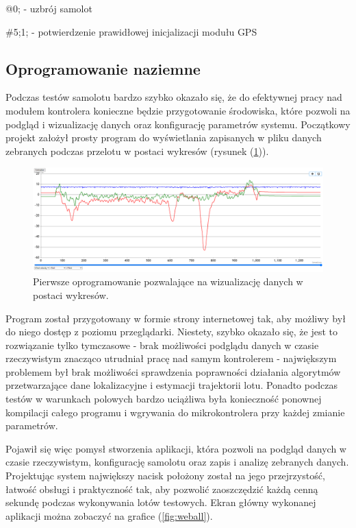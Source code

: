 \documentclass[12pt, a4paper]{article}
\let\oldref\ref
\renewcommand{\ref}[1]{(\oldref{#1})}
\begin{document}
@0; - uzbrój samolot

\#5;1; - potwierdzenie prawidłowej inicjalizacji modułu GPS

\FloatBarrier
\subsection{Oprogramowanie naziemne}
Podczas testów samolotu bardzo szybko okazało się, że do efektywnej pracy nad modułem kontrolera konieczne będzie przygotowanie środowiska, które pozwoli na podgląd i wizualizację danych oraz konfigurację parametrów systemu. Początkowy projekt założył prosty program do wyświetlania zapisanych w pliku danych zebranych podczas przelotu w postaci wykresów (rysunek \ref{fig:staryprogram}).

 \begin{figure}[ht]
    \centering
    \includegraphics[width=1\textwidth]{starysystem}
    \caption{Pierwsze oprogramowanie pozwalające na wizualizację danych w postaci wykresów.}
    \label{fig:staryprogram}
\end{figure}

Program został przygotowany w formie strony internetowej tak, aby możliwy był do niego dostęp z poziomu przeglądarki. Niestety, szybko okazało się, że jest to rozwiązanie tylko tymczasowe - brak możliwości podglądu danych w czasie rzeczywistym znacząco utrudniał pracę nad samym kontrolerem - największym problemem był brak możliwości sprawdzenia poprawności działania algorytmów przetwarzające dane lokalizacyjne i estymacji trajektorii lotu. Ponadto podczas testów w warunkach polowych bardzo uciążliwa była konieczność ponownej kompilacji całego programu i wgrywania do mikrokontrolera przy każdej zmianie parametrów. 

Pojawił się więc pomysł stworzenia aplikacji, która pozwoli na podgląd danych w czasie rzeczywistym, konfigurację samolotu oraz zapis i analizę zebranych danych. Projektując system największy nacisk położony został na jego przejrzystość, łatwość obsługi i praktyczność tak, aby pozwolić zaoszczędzić każdą cenną sekundę podczas wykonywania lotów testowych. Ekran główny wykonanej aplikacji można zobaczyć na grafice \ref{fig:weball}.
\end{document}
